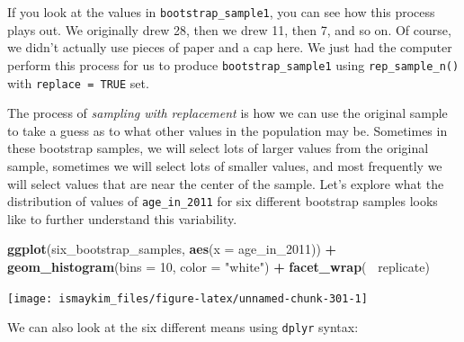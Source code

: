 \documentclass[12pt,]{krantz}
\makeatletter
\newenvironment{Shaded}{\begin{snugshade}}{\end{snugshade}}
\newcommand{\KeywordTok}[1]{\textcolor[rgb]{0.27,0.27,0.27}{\textbf{#1}}}
\newcommand{\DataTypeTok}[1]{\textcolor[rgb]{0.27,0.27,0.27}{#1}}
\newcommand{\DecValTok}[1]{\textcolor[rgb]{0.06,0.06,0.06}{#1}}
\newcommand{\StringTok}[1]{\textcolor[rgb]{0.5,0.5,0.5}{#1}}
\newcommand{\OtherTok}[1]{\textcolor[rgb]{0.37,0.37,0.37}{#1}}
\newcommand{\OperatorTok}[1]{\textcolor[rgb]{0.43,0.43,0.43}{\textbf{#1}}}
\newcommand{\NormalTok}[1]{#1}
\newenvironment{kframe}{%
\medskip{}
\setlength{\fboxsep}{.8em}
 \def\at@end@of@kframe{}%
 \ifinner\ifhmode%
  \def\at@end@of@kframe{\end{minipage}}%
  \begin{minipage}{\columnwidth}%
 \fi\fi%
 \def\FrameCommand##1{\hskip\@totalleftmargin \hskip-\fboxsep
 \colorbox{shadecolor}{##1}\hskip-\fboxsep
     \hskip-\linewidth \hskip-\@totalleftmargin \hskip\columnwidth}%
 \MakeFramed {\advance\hsize-\width
   \@totalleftmargin\z@ \linewidth\hsize
   \@setminipage}}%
 {\par\unskip\endMakeFramed%
 \at@end@of@kframe}
\renewenvironment{Shaded}{\begin{kframe}}{\end{kframe}}
\theoremstyle{definition}
\theoremstyle{definition}
\theoremstyle{definition}
\theoremstyle{remark}
\makeatother
\begin{document}
If you look at the values in \texttt{bootstrap\_sample1}, you can see
how this process plays out. We originally drew 28, then we drew 11, then
7, and so on. Of course, we didn't actually use pieces of paper and a
cap here. We just had the computer perform this process for us to
produce \texttt{bootstrap\_sample1} using \texttt{rep\_sample\_n()} with
\texttt{replace\ =\ TRUE} set.

The process of \emph{sampling with replacement} is how we can use the
original sample to take a guess as to what other values in the
population may be. Sometimes in these bootstrap samples, we will select
lots of larger values from the original sample, sometimes we will select
lots of smaller values, and most frequently we will select values that
are near the center of the sample. Let's explore what the distribution
of values of \texttt{age\_in\_2011} for six different bootstrap samples
looks like to further understand this variability.

\begin{Shaded}
\end{Shaded}

\begin{Shaded}
\begin{Highlighting}[]
\KeywordTok{ggplot}\NormalTok{(six_bootstrap_samples, }\KeywordTok{aes}\NormalTok{(}\DataTypeTok{x =}\NormalTok{ age_in_}\DecValTok{2011}\NormalTok{)) }\OperatorTok{+}
\StringTok{  }\KeywordTok{geom_histogram}\NormalTok{(}\DataTypeTok{bins =} \DecValTok{10}\NormalTok{, }\DataTypeTok{color =} \StringTok{"white"}\NormalTok{) }\OperatorTok{+}
\StringTok{  }\KeywordTok{facet_wrap}\NormalTok{(}\OperatorTok{~}\StringTok{ }\NormalTok{replicate)}
\end{Highlighting}
\end{Shaded}

\begin{center}\texttt{[image: ismaykim\_files/figure-latex/unnamed-chunk-301-1]} \end{center}

We can also look at the six different means using \texttt{dplyr} syntax:
\end{document}
